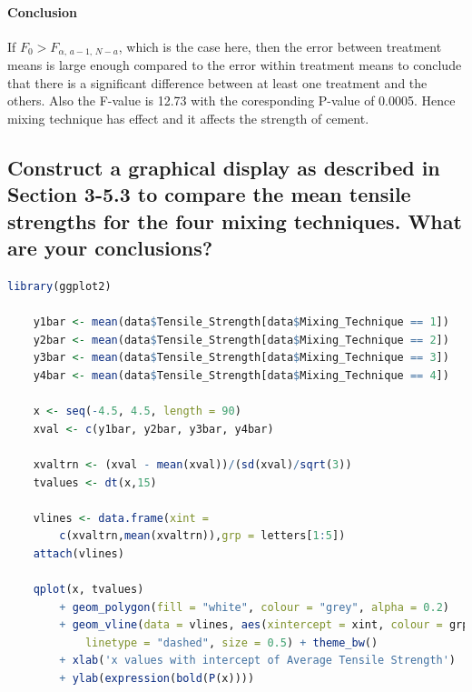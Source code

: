 \documentclass[11pt]{article}
\begin{document}
\paragraph{Conclusion}
If $\displaystyle F_{0}>F_{\alpha ,\,a-1,\,N-a}$, which is the case here, then the error between treatment means is large enough compared to the error within treatment means to conclude that there is a significant difference between at least one treatment and the others. Also the F-value is 12.73 with the coresponding P-value of 0.0005. Hence mixing technique has effect and it affects the strength of cement.

\subsection{Construct a graphical display as described in Section 3-5.3 to compare the mean tensile strengths for the four mixing techniques. What are your conclusions?}


\begin{lstlisting}[language=R]
    library(ggplot2)

    y1bar <- mean(data$Tensile_Strength[data$Mixing_Technique == 1])
    y2bar <- mean(data$Tensile_Strength[data$Mixing_Technique == 2])
    y3bar <- mean(data$Tensile_Strength[data$Mixing_Technique == 3])
    y4bar <- mean(data$Tensile_Strength[data$Mixing_Technique == 4])
    
    x <- seq(-4.5, 4.5, length = 90)
    xval <- c(y1bar, y2bar, y3bar, y4bar)
    
    xvaltrn <- (xval - mean(xval))/(sd(xval)/sqrt(3))
    tvalues <- dt(x,15)
    
    vlines <- data.frame(xint = 
        c(xvaltrn,mean(xvaltrn)),grp = letters[1:5])
    attach(vlines)
    
    qplot(x, tvalues) 
        + geom_polygon(fill = "white", colour = "grey", alpha = 0.2)  
        + geom_vline(data = vlines, aes(xintercept = xint, colour = grp), 
            linetype = "dashed", size = 0.5) + theme_bw() 
        + xlab('x values with intercept of Average Tensile Strength') 
        + ylab(expression(bold(P(x))))
  
\end{lstlisting}
\end{document}
